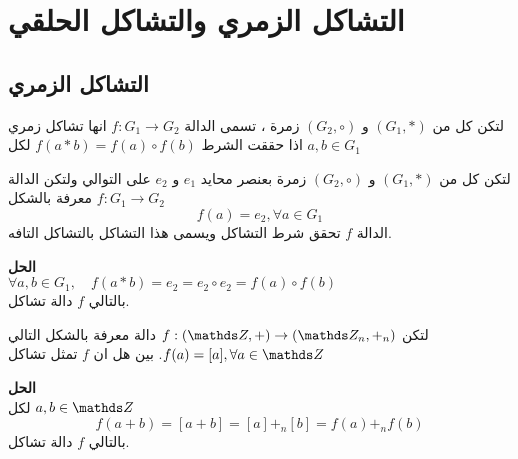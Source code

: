 \chapter{التشاكل الزمري والتشاكل الحلقي}

\section{التشاكل الزمري}

\begin{definition}
	لتكن كل من $(G_1, *)$ و $(G_2, \circ)$ زمرة ، تسمى الدالة $f : G_1\to G_2 $ انها تشاكل زمري اذا حققت الشرط  $f(a * b) = f(a) \circ f(b)$ لكل $a, b \in G_1 $ 
\end{definition}

\begin{example}
	لتكن كل من $(G_1, *)$ و $(G_2, \circ)$ زمرة بعنصر محايد $e_1 $ و $e_2$ على التوالي ولتكن الدالة $f : G_1\to G_2 $ معرفة بالشكل 
	\[
	f(a) = e_2, \forall a\in G_1
	\]
	الدالة $f$ تحقق شرط التشاكل ويسمى هذا التشاكل بالتشاكل التافه.
\end{example}
\noindent
\textbf{الحل}\\
$
\forall a, b\in G_1 , \quad f(a * b) = e_2 = e_2 \circ e_2 = f(a) \circ f(b)
$\\
بالتالي $f$ دالة تشاكل.

\begin{example}
	لتكن 
	$f : (\Z, +) \to (\Z_n, +_n)$ دالة معرفة بالشكل التالي $f(a) = [a], \forall a\in \Z$. بين هل ان $f$ تمثل تشاكل
\end{example}
\noindent
\textbf{الحل}\\
\noindent
لكل $a, b\in \Z$
\[
f(a + b) = [a + b] = [a] +_n [b] = f(a) +_n f(b)
\]
بالتالي $f$ دالة تشاكل.

